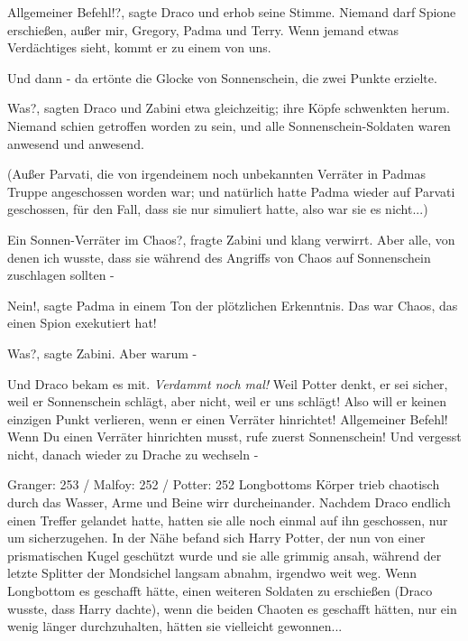 \glqq{}Allgemeiner Befehl!?\grqq{}, sagte Draco und erhob seine Stimme. \glqq{}
Niemand darf Spione erschießen, außer mir, Gregory, Padma und Terry. Wenn jemand
etwas Verdächtiges sieht, kommt er zu einem von uns.\grqq{}

Und dann - da ertönte die Glocke von Sonnenschein, die zwei Punkte erzielte.

\glqq{}Was?\grqq{}, sagten Draco und Zabini etwa gleichzeitig; ihre Köpfe
schwenkten herum. Niemand schien getroffen worden zu sein, und alle
Sonnenschein-Soldaten waren anwesend und anwesend.

(Außer Parvati, die von irgendeinem noch unbekannten Verräter in Padmas Truppe
angeschossen worden war; und natürlich hatte Padma wieder auf Parvati
geschossen, für den Fall, dass sie nur simuliert hatte, also war sie es
nicht...)

\glqq{}Ein Sonnen-Verräter im Chaos?\grqq{}, fragte Zabini und klang verwirrt.
\glqq{}Aber alle, von denen ich wusste, dass sie während des Angriffs von Chaos
auf Sonnenschein zuschlagen sollten -\grqq{}

\glqq{}Nein!\grqq{}, sagte Padma in einem Ton der plötzlichen Erkenntnis. \glqq{}
Das war Chaos, das einen Spion exekutiert hat!\grqq{}

\glqq{}Was?\grqq{}, sagte Zabini. \glqq{}Aber warum -\grqq{}

Und Draco bekam es mit.
\emph{Verdammt noch mal!}
\glqq{}Weil Potter denkt, er sei sicher, weil er Sonnenschein schlägt, aber
nicht, weil er uns schlägt! Also will er keinen einzigen Punkt verlieren, wenn
er einen Verräter hinrichtet! Allgemeiner Befehl! Wenn Du einen Verräter
hinrichten musst, rufe zuerst Sonnenschein! Und vergesst nicht, danach wieder zu
Drache zu wechseln -\grqq{}

Granger: 253 / Malfoy: 252 / Potter: 252 Longbottoms Körper trieb chaotisch
durch das Wasser, Arme und Beine wirr durcheinander. Nachdem Draco endlich einen
Treffer gelandet hatte, hatten sie alle noch einmal auf ihn geschossen, nur um
sicherzugehen. In der Nähe befand sich Harry Potter, der nun von einer
prismatischen Kugel geschützt wurde und sie alle grimmig ansah, während der
letzte Splitter der Mondsichel langsam abnahm, irgendwo weit weg. Wenn
Longbottom es geschafft hätte, einen weiteren Soldaten zu erschießen (Draco
wusste, dass Harry dachte), wenn die beiden Chaoten es geschafft hätten, nur ein
wenig länger durchzuhalten, hätten sie vielleicht gewonnen...

